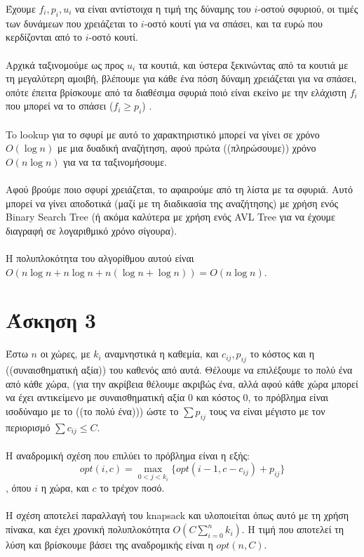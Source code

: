 \documentclass[12pt,a4paper]{article}
\begin{document}
    Έχουμε \( f_i, p_i, u_i \) να είναι αντίστοιχα η τιμή της δύναμης του \( i 
    \)-οστού σφυριού, οι τιμές των δυνάμεων που χρειάζεται το \( i \)-οστό κουτί
    για να σπάσει, και τα ευρώ που κερδίζονται από το \( i \)-οστό κουτί.\\
    \\
    Αρχικά ταξινομούμε ως προς \( u_i \) τα κουτιά, και ύστερα ξεκινώντας από τα
    κουτιά με τη μεγαλύτερη αμοιβή, βλέπουμε για κάθε ένα πόση δύναμη χρειάζεται
    για να σπάσει, οπότε έπειτα βρίσκουμε από τα διαθέσιμα σφυριά ποιό είναι
    εκείνο με την ελάχιστη \( f_i \) που μπορεί να το σπάσει (\( f_i \ge p_i \))
    .\\
    \\
    To {\latintext lookup} για το σφυρί με αυτό το χαρακτηριστικό μπορεί να
    γίνει σε χρόνο \( Ο(\log{n}) \) με μια δυαδική αναζήτηση, αφού πρώτα
    ((πληρώσουμε)) χρόνο \( Ο(n\log{n}) \) για να τα ταξινομήσουμε.\\
    \\
    Αφού βρούμε ποιο σφυρί χρειάζεται, το αφαιρούμε από τη λίστα με τα σφυριά.
    Αυτό μπορεί να γίνει αποδοτικά (μαζί με τη διαδικασία της αναζήτησης) με
    χρήση ενός {\latintext Binary Search Tree} (ή ακόμα καλύτερα με χρήση ενός
    {\latintext AVL Tree} για να έχουμε διαγραφή σε λογαριθμικό χρόνο σίγουρα).
    \\
    \\
    Η πολυπλοκότητα του αλγορίθμου αυτού είναι \( O(n\log{n} + n\log{n} +
    n(\log{n} + \log{n})) = O(n\log{n}) \).

  \section{Άσκηση 3}
  

    Έστω \( n \) οι χώρες, με \( k_i \)
    αναμνηστικά η καθεμία, και \( c_{ij}, p_{ij} \) το κόστος και η
    ((συναισθηματική αξία)) του καθενός από αυτά. Θέλουμε να επιλέξουμε το πολύ
    ένα από κάθε χώρα, (για την ακρίβεια θέλουμε ακριβώς ένα, αλλά αφού κάθε
    χώρα μπορεί να έχει αντικείμενο με συναισθηματική αξία 0 και κόστος 0, το
    πρόβλημα είναι ισοδύναμο με το ((το πολύ ένα))) ώστε το \( \sum{p_{ij}} \)
    τους να είναι μέγιστο με τον περιορισμό \( \sum{c_{ij}} \le C \). \\
    \\
    Η αναδρομική σχέση που επιλύει το πρόβλημα είναι η εξής:
    \[ opt(i, c) = \max_{0 < j < k_i}\{ opt(i - 1, c - c_{ij}) + p_{ij} \} \]
    , όπου \( i \) η χώρα, και \( c \) το τρέχον ποσό. \\
    \\
    Η σχέση αποτελεί παραλλαγή του {\latintext knapsack} και υλοποιείται όπως
    αυτό με τη χρήση πίνακα, και έχει χρονική πολυπλοκότητα
    \( O(C\sum_{i=0}^{n}{k_i}) \). Η τιμή που αποτελεί τη λύση και βρίσκουμε
    βάσει της αναδρομικής είναι η \( opt(n, C) \).
\end{document}
